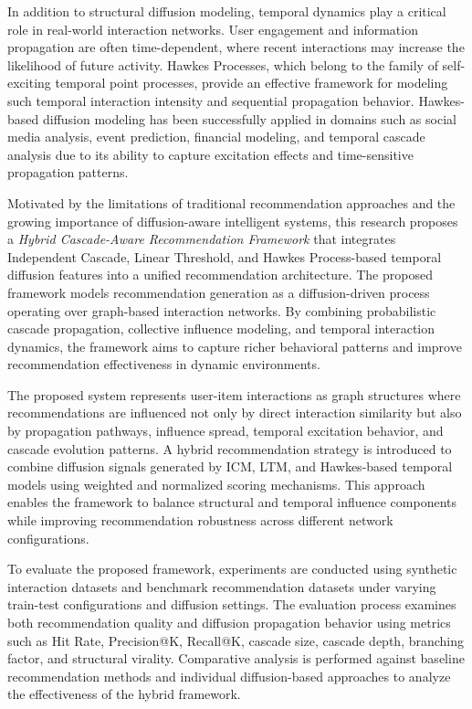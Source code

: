 \documentclass{article}
\begin{document}
In addition to structural diffusion modeling, temporal dynamics play a critical role in real-world interaction networks. User engagement and information propagation are often time-dependent, where recent interactions may increase the likelihood of future activity. Hawkes Processes, which belong to the family of self-exciting temporal point processes, provide an effective framework for modeling such temporal interaction intensity and sequential propagation behavior. Hawkes-based diffusion modeling has been successfully applied in domains such as social media analysis, event prediction, financial modeling, and temporal cascade analysis due to its ability to capture excitation effects and time-sensitive propagation patterns.

Motivated by the limitations of traditional recommendation approaches and the growing importance of diffusion-aware intelligent systems, this research proposes a \textit{Hybrid Cascade-Aware Recommendation Framework} that integrates Independent Cascade, Linear Threshold, and Hawkes Process-based temporal diffusion features into a unified recommendation architecture. The proposed framework models recommendation generation as a diffusion-driven process operating over graph-based interaction networks. By combining probabilistic cascade propagation, collective influence modeling, and temporal interaction dynamics, the framework aims to capture richer behavioral patterns and improve recommendation effectiveness in dynamic environments.

The proposed system represents user-item interactions as graph structures where recommendations are influenced not only by direct interaction similarity but also by propagation pathways, influence spread, temporal excitation behavior, and cascade evolution patterns. A hybrid recommendation strategy is introduced to combine diffusion signals generated by ICM, LTM, and Hawkes-based temporal models using weighted and normalized scoring mechanisms. This approach enables the framework to balance structural and temporal influence components while improving recommendation robustness across different network configurations.

To evaluate the proposed framework, experiments are conducted using synthetic interaction datasets and benchmark recommendation datasets under varying train-test configurations and diffusion settings. The evaluation process examines both recommendation quality and diffusion propagation behavior using metrics such as Hit Rate, Precision@K, Recall@K, cascade size, cascade depth, branching factor, and structural virality. Comparative analysis is performed against baseline recommendation methods and individual diffusion-based approaches to analyze the effectiveness of the hybrid framework.
\end{document}
